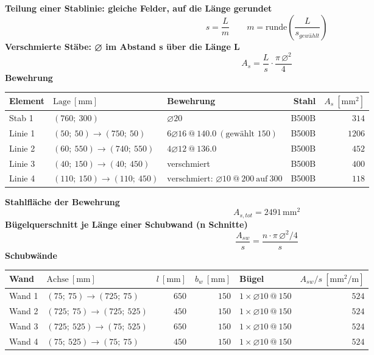 \documentclass[11pt,a4paper]{article}
\begin{document}
\noindent\textbf{Teilung einer Stablinie: gleiche Felder, auf die Länge gerundet}
\begin{equation*}
s = \frac{L}{m} \qquad m = \mathrm{runde}\left(\frac{L}{s_{gewählt}}\right)
\end{equation*}
\noindent\textbf{Verschmierte Stäbe: ⌀ im Abstand s über die Länge L}
\begin{equation*}
A_s = \frac{L}{s} \cdot \frac{\pi\, \varnothing^2}{4}
\end{equation*}
\noindent\textbf{Bewehrung}
\begin{longtable}{lllrr}
\hline
Element & $\text{Lage}\ [\mathrm{mm}]$ & Bewehrung & Stahl & $A_s\ [\mathrm{mm}^2]$ \\
\hline
\endhead
Stab 1 & $(760;\ 300)$ & $\varnothing 20$ & B500B & $314$ \\
Linie 1 & $(50;\ 50) \rightarrow (750;\ 50)$ & $6 \varnothing 16\ @\ 140.0\ (\text{gewählt } 150)$ & B500B & $1206$ \\
Linie 2 & $(60;\ 550) \rightarrow (740;\ 550)$ & $4 \varnothing 12\ @\ 136.0$ & B500B & $452$ \\
Linie 3 & $(40;\ 150) \rightarrow (40;\ 450)$ & verschmiert & B500B & $400$ \\
Linie 4 & $(110;\ 150) \rightarrow (110;\ 450)$ & $\text{verschmiert: } \varnothing 10\ @\ 200\ \text{auf}\ 300$ & B500B & $118$ \\
\hline
\end{longtable}
\noindent\textbf{Stahlfläche der Bewehrung}
\begin{equation*}
A_{s,tot} = 2491\,\mathrm{mm}^{2}
\end{equation*}
\noindent\textbf{Bügelquerschnitt je Länge einer Schubwand (n Schnitte)}
\begin{equation*}
\frac{A_{sw}}{s} = \frac{n \cdot \pi\, \varnothing^2 / 4}{s}
\end{equation*}
\noindent\textbf{Schubwände}
\begin{longtable}{llrrlr}
\hline
Wand & $\text{Achse}\ [\mathrm{mm}]$ & $l\ [\mathrm{mm}]$ & $b_w\ [\mathrm{mm}]$ & Bügel & $A_{sw}/s\ [\mathrm{mm}^2/\mathrm{m}]$ \\
\hline
\endhead
Wand 1 & $(75;\ 75) \rightarrow (725;\ 75)$ & $650$ & $150$ & $1 \times \varnothing 10\ @\ 150$ & $524$ \\
Wand 2 & $(725;\ 75) \rightarrow (725;\ 525)$ & $450$ & $150$ & $1 \times \varnothing 10\ @\ 150$ & $524$ \\
Wand 3 & $(725;\ 525) \rightarrow (75;\ 525)$ & $650$ & $150$ & $1 \times \varnothing 10\ @\ 150$ & $524$ \\
Wand 4 & $(75;\ 525) \rightarrow (75;\ 75)$ & $450$ & $150$ & $1 \times \varnothing 10\ @\ 150$ & $524$ \\
\hline
\end{longtable}
\end{document}
